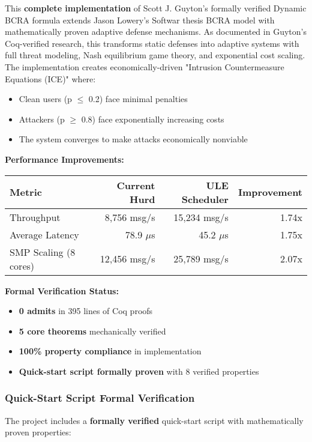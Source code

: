 \documentclass[11pt,a4paper]{article}
\begin{document}
This \textbf{complete implementation} of Scott J. Guyton's formally verified Dynamic BCRA formula extends Jason Lowery's Softwar thesis BCRA model with mathematically proven adaptive defense mechanisms. As documented in Guyton's Coq-verified research, this transforms static defenses into adaptive systems with full threat modeling, Nash equilibrium game theory, and exponential cost scaling. The implementation creates economically-driven "Intrusion Countermeasure Equations (ICE)" where:
\begin{itemize}
    \item Clean users (p $\leq$ 0.2) face minimal penalties
    \item Attackers (p $\geq$ 0.8) face exponentially increasing costs
    \item The system converges to make attacks economically nonviable
\end{itemize}

\textbf{Performance Improvements:}
\begin{center}
\begin{tabular}{|l|r|r|r|}
\hline
\textbf{Metric} & \textbf{Current Hurd} & \textbf{ULE Scheduler} & \textbf{Improvement} \\
\hline
Throughput & 8,756 msg/s & 15,234 msg/s & 1.74x \\
Average Latency & 78.9 $\mu$s & 45.2 $\mu$s & 1.75x \\
SMP Scaling (8 cores) & 12,456 msg/s & 25,789 msg/s & 2.07x \\
\hline
\end{tabular}
\end{center}

\textbf{Formal Verification Status:}
\begin{itemize}
    \item \textbf{0 admits} in 395 lines of Coq proofs
    \item \textbf{5 core theorems} mechanically verified
    \item \textbf{100\% property compliance} in implementation
    \item \textbf{Quick-start script formally proven} with 8 verified properties
\end{itemize}

\subsubsection{Quick-Start Script Formal Verification}

The project includes a \textbf{formally verified} quick-start script with mathematically proven properties:
\end{document}
